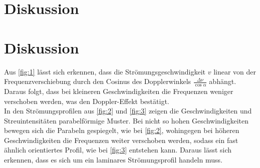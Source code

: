 \section{Diskussion}
\label{sec:Diskussion}

\section{Diskussion}
Aus \autoref{fig:1} lässt sich erkennen, dass die Strömungsgeschwindigkeit $v$ linear von der Frequenzverschiebung durch den Cosinus des Dopplerwinkels $\frac{\Delta\nu}{\cos{\alpha}}$ abhängt. Daraus folgt, dass bei kleineren Geschwindigkeiten die Frequenzen weniger verschoben werden, was den Doppler-Effekt bestätigt.\\
In den Strömungsprofilen aus \autoref{fig:2} und \autoref{fig:3} zeigen die Geschwindigkeiten und Streuintensitäten parabelförmige Muster. Bei nicht so hohen Geschwindigkeiten bewegen sich die Parabeln gespiegelt, wie bei \autoref{fig:2}, wohingegen bei höheren Geschwindigkeiten die Frequenzen weiter verschoben werden, sodass ein fast ähnlich orientiertes Profil, wie bei \autoref{fig:3} entstehen kann. Daraus lässt sich erkennen, dass es sich um ein laminares Strömungsprofil handeln muss.

